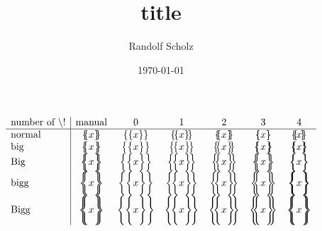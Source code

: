 \documentclass[a4paper,11pt,reqno]{scrartcl}
\date{\today}
\author{Randolf Scholz}
\title{title}
\begin{document}
\maketitle

$$
\begin{array}{l|cccccc}
\text{number of \textbackslash!} &\text{manual} & 0 & 1 & 2 & 3 & 4\\ \hline
\text{normal} &      \lbrace\mkern-6.25mu     \lbrace x      \rbrace\mkern-6.25mu     \rbrace &       \lbrace    \lbrace x      \rbrace     \rbrace  &      \lbrace\!     \lbrace x      \rbrace\!     \rbrace &      \lbrace\!\!     \lbrace x      \rbrace\!\!     \rbrace &      \lbrace\!\!\!     \lbrace x      \rbrace\!\!\!     \rbrace &      \lbrace\!\!\!\!     \lbrace x      \rbrace\!\!\!\!     \rbrace \\             
\text{big}    & \big \lbrace\mkern-8mu   \big \lbrace x \big \rbrace\mkern-8mu   \big \rbrace & \big \lbrace\big \lbrace x \big \rbrace\big \rbrace  & \big \lbrace\!\big \lbrace x \big \rbrace\!\big \rbrace & \big \lbrace\!\!\big \lbrace x \big \rbrace\!\!\big \rbrace & \big \lbrace\!\!\!\big \lbrace x  \big\rbrace\!\!\!\big \rbrace & \big \lbrace\!\!\!\!\big \lbrace x \big \rbrace\!\!\!\!\big \rbrace \\             
\text{Big}    & \Big \lbrace\mkern-9.5mu \Big \lbrace x \Big \rbrace\mkern-9.5mu \Big \rbrace & \Big \lbrace\Big \lbrace x \Big \rbrace\Big \rbrace  & \Big \lbrace\!\Big \lbrace x \Big \rbrace\!\Big \rbrace & \Big \lbrace\!\!\Big \lbrace x \Big \rbrace\!\!\Big \rbrace & \Big \lbrace\!\!\!\Big \lbrace x  \Big\rbrace\!\!\!\Big \rbrace & \Big \lbrace\!\!\!\!\Big \lbrace x \Big \rbrace\!\!\!\!\Big \rbrace \\             
\text{bigg}   & \bigg\lbrace\mkern-10.5mu\bigg\lbrace x \bigg\rbrace\mkern-10.5mu\bigg\rbrace & \bigg\lbrace\bigg\lbrace x \bigg\rbrace\bigg\rbrace  & \bigg\lbrace\!\bigg\lbrace x \bigg\rbrace\!\bigg\rbrace & \bigg\lbrace\!\!\bigg\lbrace x \bigg\rbrace\!\!\bigg\rbrace & \bigg\lbrace\!\!\!\bigg\lbrace x \bigg\rbrace\!\!\!\bigg\rbrace & \bigg\lbrace\!\!\!\!\bigg\lbrace x \bigg\rbrace\!\!\!\!\bigg\rbrace \\             
\text{Bigg}   & \Bigg\lbrace\mkern-11.5mu\Bigg\lbrace x \Bigg\rbrace\mkern-11.5mu\Bigg\rbrace & \Bigg\lbrace\Bigg\lbrace x \Bigg\rbrace\Bigg\rbrace  & \Bigg\lbrace\!\Bigg\lbrace x \Bigg\rbrace\!\Bigg\rbrace & \Bigg\lbrace\!\!\Bigg\lbrace x \Bigg\rbrace\!\!\Bigg\rbrace & \Bigg\lbrace\!\!\!\Bigg\lbrace x \Bigg\rbrace\!\!\!\Bigg\rbrace & \Bigg\lbrace\!\!\!\!\Bigg\lbrace x \Bigg\rbrace\!\!\!\!\Bigg\rbrace \\             
\end{array}
$$
\end{document}
